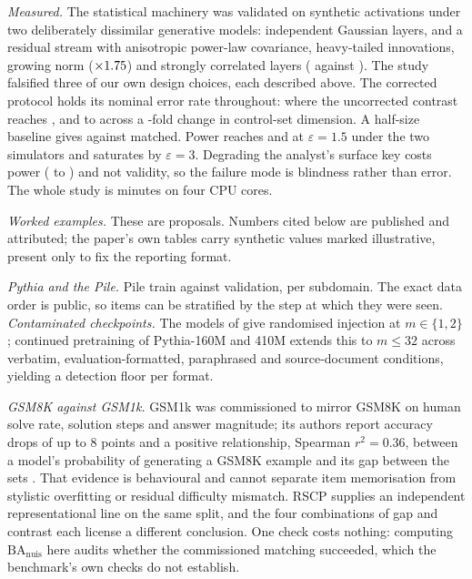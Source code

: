 \documentclass[10pt,letterpaper]{article}
\newcommand{\BA}{\mathrm{BA}}
\newcommand{\nuis}{\mathrm{nuis}}
\begin{document}
\textit{Measured.} The statistical machinery was validated on synthetic
activations under two deliberately dissimilar generative models: independent
Gaussian layers, and a residual stream with anisotropic power-law covariance,
heavy-tailed innovations, growing norm ($\times1.75$) and strongly
correlated layers (\PropBCorr{} against \PropACorr). The study falsified three
of our own design choices, each described above. The corrected protocol holds
its nominal error rate throughout: \SlopeAAdjFifty{} where the uncorrected
contrast reaches \SlopeARawFifty{}, and \CapContrastMatch{} to
\CapContrastHuge{} across a \CapRatio-fold change in control-set dimension. A
half-size baseline gives \SizeHalfA{} against \SizeMatchedA{} matched. Power
reaches \PwAFifteen{} and \PwBFifteen{} at $\varepsilon=1.5$ under the two
simulators and saturates by $\varepsilon=3$. Degrading the analyst's surface
key costs power (\KeyPwFive{} to \KeyPwFifty{}) and not validity, so the
failure mode is blindness rather than error. The whole study is
\RunMinutes{} minutes on four CPU cores.

\textit{Worked examples.} These are proposals. Numbers cited below are published and attributed; the paper's own tables carry synthetic values marked illustrative, present only to fix the reporting format.

\textit{Pythia and the Pile.} Pile train against validation, per subdomain. The exact data order is public, so items can be stratified by the step at which they were seen. \textit{Contaminated checkpoints.} The models of \citet{oren2024proving} give randomised injection at $m\in\{1,2\}$; continued pretraining of Pythia-160M and 410M extends this to $m\le32$ across verbatim, evaluation-formatted, paraphrased \cite{yang2023rephrased} and source-document conditions, yielding a detection floor per format.

\textit{GSM8K against GSM1k.} GSM1k was commissioned to mirror GSM8K on human solve rate, solution steps and answer magnitude; its authors report accuracy drops of up to 8 points and a positive relationship, Spearman $r^2=0.36$, between a model's probability of generating a GSM8K example and its gap between the sets \cite{zhang2024gsm1k}. That evidence is behavioural and cannot separate item memorisation from stylistic overfitting or residual difficulty mismatch. RSCP supplies an independent representational line on the same split, and the four combinations of gap and contrast each license a different conclusion. One check costs nothing: computing $\BA_{\nuis}$ here audits whether the commissioned matching succeeded, which the benchmark's own checks do not establish.
\end{document}
